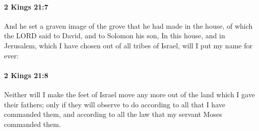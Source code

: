 		\paragraph{2 Kings 21:7} %
			\label{2KINGS-21-7}

			And he set a graven image of the grove that he had made in the house, of which the LORD said to David, and to Solomon his son, In this house, and in Jerusalem, which I have chosen out of all tribes of Israel, will I put my name for ever:


		\paragraph{2 Kings 21:8} %
			\label{2KINGS-21-8}

			Neither will I make the feet of Israel move any more out of the land which I gave their fathers; only if they will observe to do according to all that I have commanded them, and according to all the law that my servant Moses commanded them.

